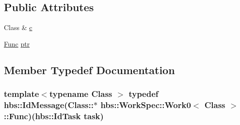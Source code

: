\subsection*{Public Attributes}
\begin{DoxyCompactItemize}
\item 
Class \& \hyperlink{structhbs_1_1_work_spec_1_1_work0_a62e5d34572e07faeb1797c372416845c}{c}
\item 
\hyperlink{structhbs_1_1_work_spec_1_1_work0_a0dd8e012a697002cfeb11b4da10f7f05}{Func} \hyperlink{structhbs_1_1_work_spec_1_1_work0_a99e7551bb790b3f9f661732abc77c582}{ptr}
\end{DoxyCompactItemize}


\subsection{Member Typedef Documentation}
\hypertarget{structhbs_1_1_work_spec_1_1_work0_a0dd8e012a697002cfeb11b4da10f7f05}{
\subsubsection[{Func}]{\setlength{\rightskip}{0pt plus 5cm}template$<$typename Class $>$ typedef {\bf hbs\-::\-Id\-Message}(Class\-::$\ast$ {\bf hbs\-::\-Work\-Spec\-::\-Work0}$<$ Class $>$\-::Func)({\bf hbs\-::\-Id\-Task} task)}}\label{structhbs_1_1_work_spec_1_1_work0_a0dd8e012a697002cfeb11b4da10f7f05}


